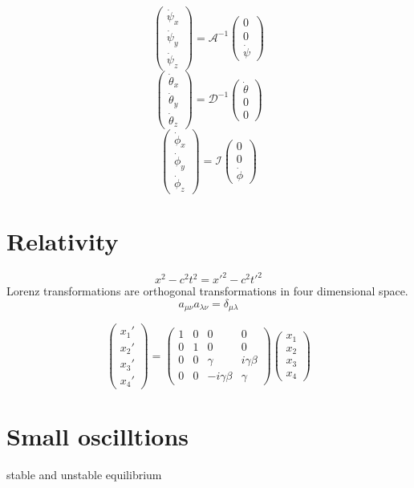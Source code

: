 \documentclass[12pt]{article}
\begin{document}
\[
\begin{pmatrix}
\dot{\psi}_{x}\\
\dot{\psi}_{y}\\
\dot{\psi}_{z}
\end{pmatrix}
=\mathcal{A}^{-1}
\begin{pmatrix}
0\\0\\\dot{\psi}
\end{pmatrix}
\]
\[
\begin{pmatrix}
\dot{\theta}_{x}\\
\dot{\theta}_{y}\\
\dot{\theta}_{z}
\end{pmatrix}
=\mathcal{D}^{-1}
\begin{pmatrix}
\dot{\theta}\\0\\0
\end{pmatrix}
\]
\[
\begin{pmatrix}
\dot{\phi}_{x}\\
\dot{\phi}_{y}\\
\dot{\phi}_{z}
\end{pmatrix}
=\mathcal{I}
\begin{pmatrix}
0\\0\\\dot{\phi}
\end{pmatrix}
\]

\section*{Relativity}

\[x^2-c^2t^2=x'^2-c^2t'^2\]
Lorenz transformations are orthogonal transformations in four dimensional space.
\[a_{\mu\nu}a_{\lambda\nu}=\delta_{\mu\lambda}\]

\[
\begin{pmatrix}
x_1'\\ x_2'\\ x_3'\\ x_4'
\end{pmatrix}
=
\begin{pmatrix}
1& 0& 0& 0\\ 0& 1& 0& 0\\ 0& 0& \gamma& i\gamma\beta\\ 0& 0& -i\gamma\beta& \gamma
\end{pmatrix}
\begin{pmatrix}
x_1\\ x_2\\ x_3\\ x_4
\end{pmatrix}
\]

\section*{Small oscilltions}
stable and unstable equilibrium
\end{document}
